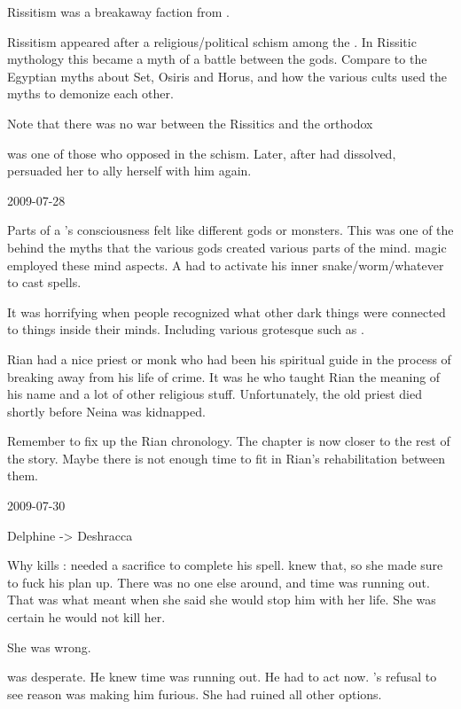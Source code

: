 Rissitism was a breakaway faction from \Ortaica. 

Rissitism appeared after a religious/political schism among the \Taorthae. 
In Rissitic mythology this became a myth of a battle between the gods. 
Compare to the Egyptian myths about Set, Osiris and Horus, and how the various cults used the myths to demonize each other. 

Note that there was no war between the Rissitics and the orthodox 

\Nzessuacrith was one of those who opposed \Secherdamon in the schism.
Later, after \Ortaica had dissolved, \Secherdamon persuaded her to ally herself with him again. 



2009-07-28

Parts of a \scatha's consciousness felt like different gods or monsters. 
This was one of the  behind the myths that the various gods created various parts of the \scathaese mind. 
\Rethyax magic employed these mind aspects. 
A \rethyax had to activate his inner snake/worm/whatever to cast spells. 

It was horrifying when people recognized what other dark things were connected to things inside their minds.
Including various grotesque \xss such as \Ubloth.


Rian had a nice priest or monk who had been his spiritual guide in the process of breaking away from his life of crime. 
It was he who taught Rian the meaning of his name and a lot of other religious stuff. 
Unfortunately, the old priest died shortly before Neina was kidnapped. 

Remember to fix up the Rian chronology. 
The  chapter is now closer to the rest of the story. 
Maybe there is not enough time to fit in Rian's rehabilitation between them. 



2009-07-30

Delphine -> Deshracca

Why \Ishnaruchaefir kills \Rystessakhin:
  \Ishnaruchaefir needed a sacrifice to complete his spell. 
  \Rystessakhin knew that, so she made sure to fuck his plan up.
  There was no one else around, and time was running out. 
  That was what \Rystessakhin meant when she said she would stop him with her life.
  She was certain he would not kill her. 
  
  She was wrong. 
  
  \Ishnaruchaefir was desperate.
  He knew time was running out.
  He had to act now.
  \Rystessakhin's refusal to see reason was making him furious.
  She had ruined all other options.
  
